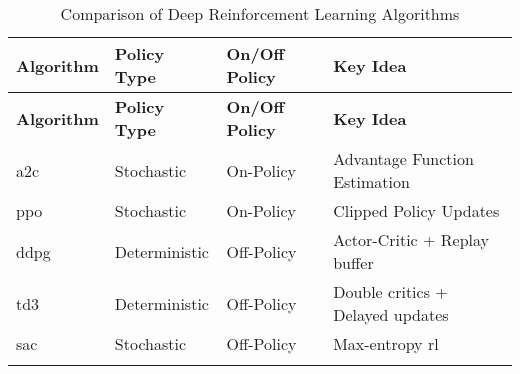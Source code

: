 \begin{longtable}{|l|l|l|l|}
    \hline
    \textbf{Algorithm} & \textbf{Policy Type} & \textbf{On/Off Policy} & \textbf{Key Idea} \\ \midrule
    \endfirsthead

    \hline
    \textbf{Algorithm} & \textbf{Policy Type} & \textbf{On/Off Policy} & \textbf{Key Idea} \\ \midrule
    \endhead

    \endfoot

    \hline
    \acrshort{a2c} & Stochastic & On-Policy & Advantage Function Estimation \\ \hline
    \acrshort{ppo} & Stochastic & On-Policy & Clipped Policy Updates \\ \hline
    \acrshort{ddpg} & Deterministic & Off-Policy & Actor-Critic + Replay buffer \\ \hline
    \acrshort{td3} & Deterministic & Off-Policy & Double critics + Delayed updates \\ \hline
    \acrshort{sac} & Stochastic & Off-Policy & Max-entropy \acrshort{rl} \\ \hline
\caption{Comparison of Deep Reinforcement Learning Algorithms}
\label{tab:drl_algorithms_comparison}
\end{longtable}
